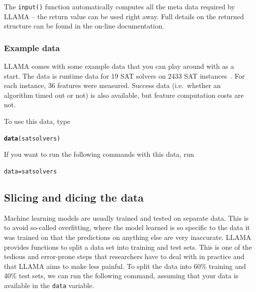 \documentclass{article}\usepackage[]{graphicx}\usepackage[]{color}
\makeatletter
\newcommand{\hlstd}[1]{\textcolor[rgb]{0.345,0.345,0.345}{#1}}%
\newcommand{\hlkwb}[1]{\textcolor[rgb]{0.69,0.353,0.396}{#1}}%
\newcommand{\hlkwd}[1]{\textcolor[rgb]{0.737,0.353,0.396}{\textbf{#1}}}%
\newenvironment{kframe}{%
 \def\at@end@of@kframe{}%
 \ifinner\ifhmode%
  \def\at@end@of@kframe{\end{minipage}}%
  \begin{minipage}{\columnwidth}%
 \fi\fi%
 \def\FrameCommand##1{\hskip\@totalleftmargin \hskip-\fboxsep
 \colorbox{shadecolor}{##1}\hskip-\fboxsep
     \hskip-\linewidth \hskip-\@totalleftmargin \hskip\columnwidth}%
 \MakeFramed {\advance\hsize-\width
   \@totalleftmargin\z@ \linewidth\hsize
   \@setminipage}}%
 {\par\unskip\endMakeFramed%
 \at@end@of@kframe}
\newenvironment{knitrout}{}{} %
\makeatother
\begin{document}
The \lstinline{input()} function automatically computes all the meta data
required by LLAMA -- the return value can be used right away. Full details on
the returned structure can be found in the on-line documentation.

\subsubsection{Example data}

LLAMA comes with some example data that you can play around with as a start. The
data is runtime data for 19 SAT solvers on 2433 SAT
instances~\cite{hurley_proteus_2014}. For each instance, 36 features were
measured. Success data (i.e.\ whether an algorithm timed out or not) is also
available, but feature computation costs are not.

To use this data, type

\begin{knitrout}
\color{fgcolor}\begin{kframe}
\begin{alltt}
\hlkwd{data}\hlstd{(satsolvers)}
\end{alltt}
\end{kframe}
\end{knitrout}
If you want to run the following commands with this data, run
\begin{knitrout}
\color{fgcolor}\begin{kframe}
\begin{alltt}
\hlstd{data} \hlkwb{=} \hlstd{satsolvers}
\end{alltt}
\end{kframe}
\end{knitrout}

\subsection{Slicing and dicing the data}

Machine learning models are usually trained and tested on separate data. This is
to avoid so-called overfitting, where the model learned is so specific to the
data it was trained on that the predictions on anything else are very
inaccurate. LLAMA provides functions to split a data set into training and test
sets. This is one of the tedious and error-prone steps that researchers have to
deal with in practice and that LLAMA aims to make less painful. To split the
data into 60\% training and 40\% test sets, we can run the following command,
assuming that your data is available in the \lstinline{data} variable.
\end{document}

